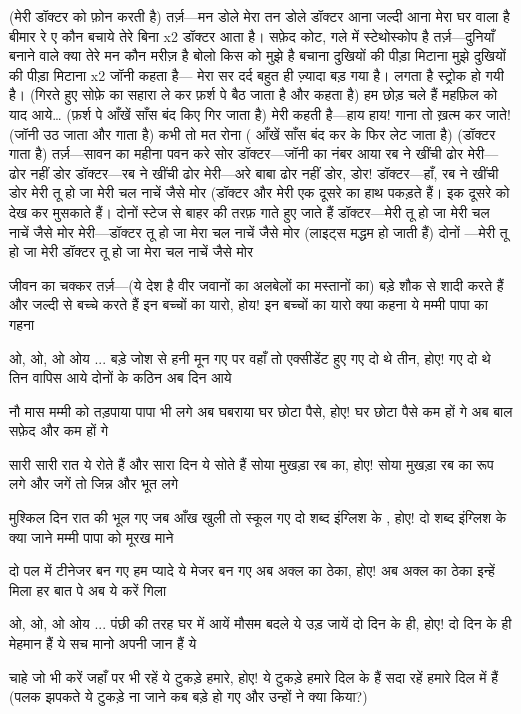 (मेरी डॉक्टर को फ़ोन करती है)
तर्ज़—मन डोले मेरा तन डोले
डॉक्टर आना जल्दी आना
मेरा घर वाला है बीमार रे ए
कौन बचाये तेरे बिना x2
डॉक्टर आता है। सफ़ेद कोट, गले में
स्टेथोस्कोप है
तर्ज़—दुनियाँ बनाने वाले क्या तेरे मन
कौन मरीज़ है बोलो
किस को मुझे है बचाना
दुखियों की पीड़ा मिटाना मुझे
दुखियों की पीड़ा मिटाना x2
जॉनी कहता है—
मेरा सर दर्द बहुत ही ज़्यादा बड़ गया है।
लगता है स्ट्रोक हो गयी है।
(गिरते हुए सोफ़े का सहारा ले कर फ़र्श पे
बैठ जाता है और कहता है)
हम छोड़ चले हैं महफ़िल को
याद आये…
(फ़र्श पे आँखें साँस बंद किए गिर जाता है)
मेरी कहती है—हाय हाय!
गाना तो ख़त्म कर जाते!
(जॉनी उठ जाता और गाता है)
कभी तो मत रोना
( आँखें साँस बंद कर के फिर लेट जाता है)
(डॉक्टर गाता है)
तर्ज़—सावन का महीना पवन करे सोर
डॉक्टर—जॉनी का नंबर आया
रब ने खींची ढोर
मेरी—ढोर नहीं डोर
डॉक्टर—रब ने खींची ढोर
मेरी—अरे बाबा ढोर नहीं डोर, डोर!
डॉक्टर—हाँ, रब ने खींची डोर
मेरी तू हो जा मेरी
चल नाचें जैसे मोर
(डॉक्टर और मेरी एक दूसरे का हाथ पकड़ते
हैं। इक दूसरे को देख कर मुसकाते हैं। दोनों
स्टेज से बाहर की तरफ़ गाते हुए जाते हैं
डॉक्टर—मेरी तू हो जा मेरी
चल नाचें जैसे मोर
मेरी—डॉक्टर तू हो जा मेरा चल नाचें जैसे मोर
(लाइट्स मद्धम हो जाती हैं)
दोनों —मेरी तू हो जा मेरी
डॉक्टर तू हो जा मेरा
चल नाचें जैसे मोर

जीवन का चक्कर
तर्ज़—(ये देश है वीर जवानों का अलबेलों का
मस्तानों का)
बड़े शौक से शादी करते हैं
और जल्दी से बच्चे करते हैं
इन बच्चों का यारो, होय!
इन बच्चों का यारो क्या कहना
ये मम्मी पापा का गहना

ओ, ओ, ओ ओय ...
बड़े जोश से हनी मून गए
पर वहाँ तो एक्सीडेंट हुए
गए दो थे तीन, होए!
गए दो थे तिन वापिस आये
दोनों के कठिन अब दिन आये

नौ मास मम्मी को तड़पाया
पापा भी लगे अब घबराया
घर छोटा पैसे, होए!
घर छोटा पैसे कम हों गे
अब बाल सफ़ेद और कम हों गे

सारी सारी रात ये रोते हैं
और सारा दिन ये सोते हैं
सोया मुखड़ा रब का, होए!
सोया मुखड़ा रब का रूप लगे
और जगें तो जिन्न और भूत लगे

मुश्किल दिन रात की भूल गए
जब आँख खुली तो स्कूल गए
दो शब्द इंग्लिश के , होए!
दो शब्द इंग्लिश के क्या जाने
मम्मी पापा को मूरख माने

दो पल में टीनेजर बन गए
हम प्यादे ये मेजर बन गए
अब अक्ल का ठेका, होए!
अब अक्ल का ठेका इन्हें मिला
हर बात पे अब ये करें गिला


ओ, ओ, ओ ओय ... 
पंछी की तरह घर में आयें
मौसम बदले ये उड़ जायें
दो दिन के ही, होए!
दो दिन के ही मेहमान हैं ये
सच मानो अपनी जान हैं ये

चाहे जो भी करें जहाँ पर भी रहें
ये टुकड़े हमारे, होए!
ये टुकड़े हमारे दिल के हैं
सदा रहें हमारे दिल में हैं
(पलक झपकते ये टुकड़े ना जाने कब बड़े हो
गए और उन्हों ने क्या किया?)

